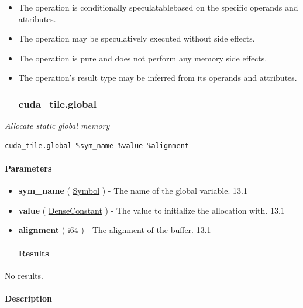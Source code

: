 \documentclass{article}
\begin{document}
\begin{itemize}
\item The operation is conditionally speculatablebased on the specific operands and attributes.
\item The operation may be speculatively executed without side effects.
\item The operation is pure and does not perform any memory side effects.
\item The operation's result type may be inferred from its operands and attributes.


\subsubsection{cuda\_tile.global}

\end{itemize}
\textit{Allocate static global memory}


\begin{lstlisting}
cuda_tile.global %sym_name %value %alignment
\end{lstlisting}

\paragraph{Parameters}

\begin{itemize}
\item \textbf{sym\_name} ( \href{https://docs.nvidia.com/cuda/tile-ir/latest/sections/operations.html#type-symbol}{Symbol} ) - The name of the global variable. 13.1
\item \textbf{value} ( \href{https://docs.nvidia.com/cuda/tile-ir/latest/sections/operations.html#type-denseconstant}{DenseConstant} ) - The value to initialize the allocation with. 13.1
\item \textbf{alignment} ( \href{https://docs.nvidia.com/cuda/tile-ir/latest/sections/types.html#subsection-element-types}{i64} ) - The alignment of the buffer. 13.1


\paragraph{Results}

\end{itemize}
No results.



\paragraph{Description}
\end{document}
